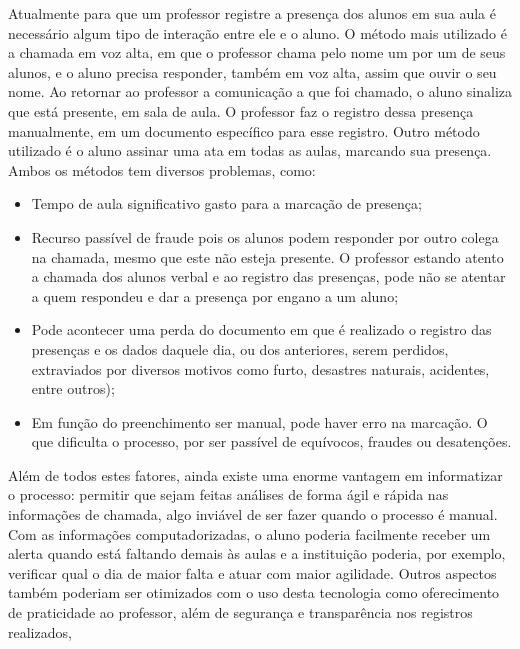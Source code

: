 \documentclass[
	12pt,
	oneside,
	a4paper,
	english,
	brazil,
]{abntex2}
\begin{document}
Atualmente para que um professor registre a presença dos alunos em sua aula é necessário algum tipo de interação entre ele e o aluno. O método mais utilizado é a chamada em voz alta, em que o professor chama pelo nome um por um de seus alunos, e o aluno precisa responder, também em voz alta, assim que ouvir o seu nome. Ao retornar ao professor a comunicação a que foi chamado, o aluno sinaliza que está presente, em sala de aula. O professor faz o registro dessa presença manualmente, em um documento específico para esse registro. Outro método utilizado é o aluno assinar uma ata em todas as aulas, marcando sua presença. Ambos os métodos tem diversos problemas, como:

\begin{itemize}
    \item Tempo de aula significativo gasto para a marcação de presença;
    \item Recurso passível de fraude pois os alunos podem responder por outro colega na chamada, mesmo que este não esteja presente. O professor estando atento a chamada dos alunos verbal e ao registro das presenças, pode não se atentar a quem respondeu e dar a presença por engano a um aluno;
    \item Pode acontecer uma perda do documento em que é realizado o registro das presenças e os dados daquele dia, ou dos anteriores, serem perdidos, extraviados por diversos motivos como furto, desastres naturais, acidentes, entre outros);
    \item Em função do preenchimento ser manual, pode haver erro na marcação. O que dificulta o processo, por ser passível de equívocos, fraudes ou desatenções.
\end{itemize}

Além de todos estes fatores, ainda existe uma enorme vantagem em informatizar o processo: permitir que sejam feitas análises de forma ágil e rápida nas informações de chamada, algo inviável de ser fazer quando o processo é manual. Com as informações computadorizadas, o aluno poderia facilmente receber um alerta quando está faltando demais às aulas e a instituição poderia, por exemplo, verificar qual o dia de maior falta e atuar com maior agilidade. Outros aspectos também poderiam ser otimizados com o uso desta tecnologia como oferecimento de praticidade ao professor, além de segurança e transparência nos registros realizados,  


\end{document}
